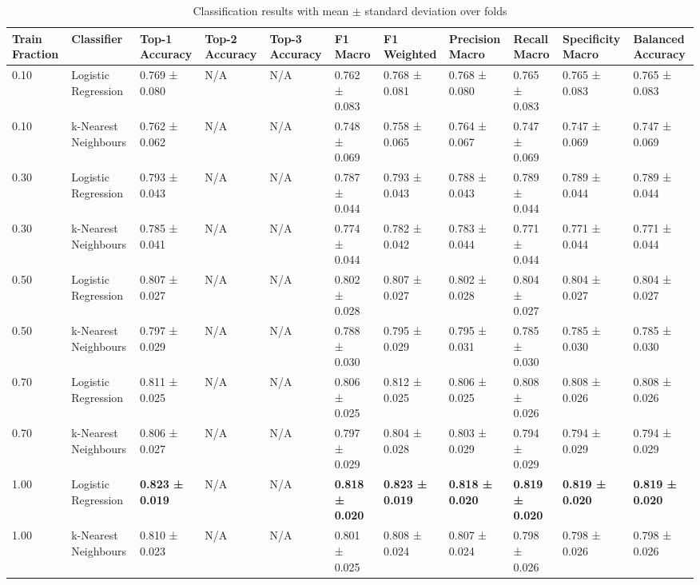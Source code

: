 
\begin{table}[ht]
\centering
\tiny
\caption{Classification results with mean $\pm$ standard deviation over folds}
\label{tab:classification_results}
\begin{tabularx}{\textwidth}{lXXXXXXXXXX}
\toprule
Train Fraction & Classifier & Top-1 Accuracy & Top-2 Accuracy & Top-3 Accuracy & F1 Macro & F1 Weighted & Precision Macro & Recall Macro & Specificity Macro & Balanced Accuracy \\
\midrule
0.10 & Logistic Regression & 0.769 ± 0.080 & N/A & N/A & 0.762 ± 0.083 & 0.768 ± 0.081 & 0.768 ± 0.080 & 0.765 ± 0.083 & 0.765 ± 0.083 & 0.765 ± 0.083 \\
0.10 & k-Nearest Neighbours & 0.762 ± 0.062 & N/A & N/A & 0.748 ± 0.069 & 0.758 ± 0.065 & 0.764 ± 0.067 & 0.747 ± 0.069 & 0.747 ± 0.069 & 0.747 ± 0.069 \\
0.30 & Logistic Regression & 0.793 ± 0.043 & N/A & N/A & 0.787 ± 0.044 & 0.793 ± 0.043 & 0.788 ± 0.043 & 0.789 ± 0.044 & 0.789 ± 0.044 & 0.789 ± 0.044 \\
0.30 & k-Nearest Neighbours & 0.785 ± 0.041 & N/A & N/A & 0.774 ± 0.044 & 0.782 ± 0.042 & 0.783 ± 0.044 & 0.771 ± 0.044 & 0.771 ± 0.044 & 0.771 ± 0.044 \\
0.50 & Logistic Regression & 0.807 ± 0.027 & N/A & N/A & 0.802 ± 0.028 & 0.807 ± 0.027 & 0.802 ± 0.028 & 0.804 ± 0.027 & 0.804 ± 0.027 & 0.804 ± 0.027 \\
0.50 & k-Nearest Neighbours & 0.797 ± 0.029 & N/A & N/A & 0.788 ± 0.030 & 0.795 ± 0.029 & 0.795 ± 0.031 & 0.785 ± 0.030 & 0.785 ± 0.030 & 0.785 ± 0.030 \\
0.70 & Logistic Regression & 0.811 ± 0.025 & N/A & N/A & 0.806 ± 0.025 & 0.812 ± 0.025 & 0.806 ± 0.025 & 0.808 ± 0.026 & 0.808 ± 0.026 & 0.808 ± 0.026 \\
0.70 & k-Nearest Neighbours & 0.806 ± 0.027 & N/A & N/A & 0.797 ± 0.029 & 0.804 ± 0.028 & 0.803 ± 0.029 & 0.794 ± 0.029 & 0.794 ± 0.029 & 0.794 ± 0.029 \\
1.00 & Logistic Regression & \textbf{0.823 ± 0.019} & N/A & N/A & \textbf{0.818 ± 0.020} & \textbf{0.823 ± 0.019} & \textbf{0.818 ± 0.020} & \textbf{0.819 ± 0.020} & \textbf{0.819 ± 0.020} & \textbf{0.819 ± 0.020} \\
1.00 & k-Nearest Neighbours & 0.810 ± 0.023 & N/A & N/A & 0.801 ± 0.025 & 0.808 ± 0.024 & 0.807 ± 0.024 & 0.798 ± 0.026 & 0.798 ± 0.026 & 0.798 ± 0.026 \\
\bottomrule
\bottomrule
\end{tabularx}
\end{table}

